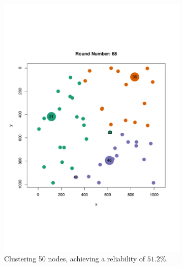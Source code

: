 \begin{figure}[bt]
    \centering
        \begin{subfigure}{0.49\textwidth}
        \centering
        \includegraphics[width=\textwidth, keepaspectratio]{figure/Results/Discussion/ClusteringExample50nodes1000x1000maxOffRun1Bad.pdf}
        \caption{Clustering 50 nodes, achieving a reliability of $51.2\%$.}
        \label{subfig:bad-clustering}
    \end{subfigure}
    \hfill
    \begin{subfigure}{0.49\textwidth}
        \centering

\end{subfigure}
\end{figure}
